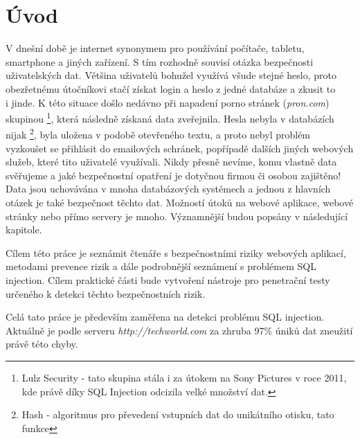 \chapter*{Úvod}
V dnešní době je internet synonymem pro používání počítače, tabletu, smartphone a jiných zařízení. S tím rozhodně souvisí otázka bezpečnosti uživatelských dat. Většina uživatelů bohužel využívá všude stejné heslo, proto obezřetnému útočníkovi stačí získat login a heslo z jedné databáze a zkusit to \\i jinde. K této situace došlo nedávno při napadení porno stránek (\textit{pron.com}) skupinou \footnote{Lulz Security - tato skupina stála i za útokem na Sony Pictures v roce 2011, kde právě díky SQL Injection odcizila velké množství dat.}, která následně získaná data zveřejnila\cite{examiner}. Hesla nebyla v databázích nijak \footnote{Hash - algoritmus pro převedení vstupních dat do unikátního otisku, tato funkce }, byla uložena v podobě otevřeného textu, a proto nebyl problém vyzkoušet se přihlásit do emailových schránek, popřípadě dalších jiných webových služeb, které tito uživatelé využívali. Nikdy přesně nevíme, komu vlastně data svěřujeme a jaké bezpečnostní opatření je dotyčnou firmou či osobou zajištěno! Data jsou uchovávána v mnoha databázových systémech a jednou z hlavních otázek je také bezpečnost těchto dat. Možností útoků na webové aplikace, webové stránky nebo přímo servery je mnoho. Významnější budou popsány v následující kapitole.

Cílem této práce je seznámit čtenáře s bezpečnostními riziky webových aplikací, metodami prevence rizik a dále podrobnější seznámení s problémem SQL injection. Cílem praktické části bude vytvoření nástroje pro penetrační testy určeného k detekci těchto bezpečnostních rizik.

Celá tato práce je především zaměřena na detekci problému SQL injection. Aktuálně je podle serveru \textit{http://techworld.com} za zhruba 97\% úniků dat zneužití právě této chyby. 